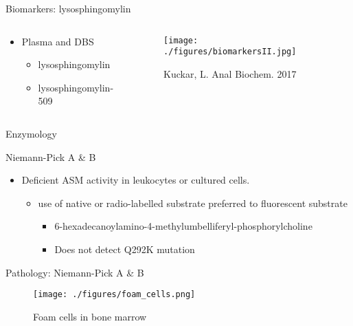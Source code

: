\documentclass[presentation, smaller]{beamer}
\begin{document}
\begin{frame}[label={sec:orgheadline17}]{Biomarkers: lysosphingomylin}
\begin{columns}
\begin{column}{0.5\columnwidth}
\begin{itemize}
\item Plasma and DBS
\begin{itemize}
\item lysosphingomylin
\item lysosphingomylin-509
\end{itemize}
\end{itemize}
\end{column}



\begin{column}{0.5\columnwidth}
\begin{figure}[htb]
\centering
\texttt{[image: ./figures/biomarkersII.jpg]}
\caption{\label{fig:}
Kuckar, L. Anal Biochem. 2017}
\end{figure}
\end{column}
\end{columns}
\end{frame}

\begin{frame}[label={sec:orgheadline18}]{Enzymology}
\begin{block}{Niemann-Pick A \& B}
\begin{itemize}
\item Deficient ASM activity in leukocytes or cultured cells.
\begin{itemize}
\item use of native or radio-labelled substrate preferred to fluorescent substrate
\begin{itemize}
\item 6-hexadecanoylamino-4-methylumbelliferyl-phosphorylcholine
\item Does not detect Q292K mutation
\end{itemize}
\end{itemize}
\end{itemize}
\end{block}
\end{frame}

\begin{frame}[label={sec:orgheadline19}]{Pathology: Niemann-Pick A \& B}
\begin{figure}[htb]
\centering
\texttt{[image: ./figures/foam\_cells.png]}
\caption{\label{fig:}
Foam cells in bone marrow}
\end{figure}
\end{frame}
\end{document}
